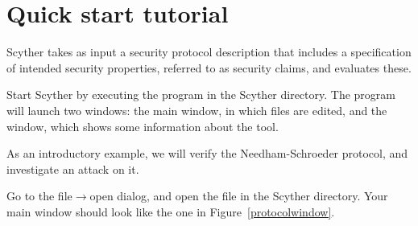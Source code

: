 \documentclass{book}
\begin{document}
\chapter{Quick start tutorial}
\label{sec:tutorial}

Scyther takes as input a security protocol description that includes a
specification of intended security properties, referred to as security
claims, and evaluates these. 

Start Scyther by executing the  program in the
Scyther directory. The program will launch two windows: the main window,
in which files are edited, and the  window, which shows some
information about the tool. 

As an introductory example, we will verify the Needham-Schroeder
protocol, and investigate an attack on it. 

Go to the file$\rightarrow$open dialog, and open the file
 in the Scyther directory. Your main window should look
like the one in Figure~\ref{protocolwindow}.
\end{document}
